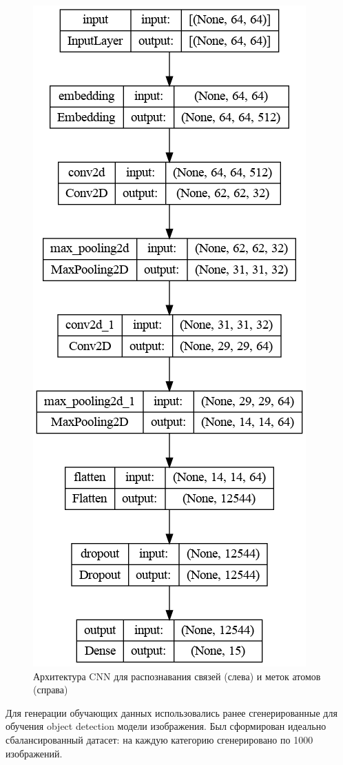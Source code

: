 \begin{figure}[ht!]
	\includegraphics [scale=0.3] {my_folder/images/model_atom}
	\caption{Архитектура CNN для распознавания связей (слева) и меток атомов (справа)}
	\label{fig:AP50_modelbondatom}
\end{figure}

Для генерации обучающих данных использовались ранее сгенерированные для обучения object detection модели изображения. Был сформирован идеально сбалансированный датасет: на каждую категорию сгенерировано по 1000 изображений.

